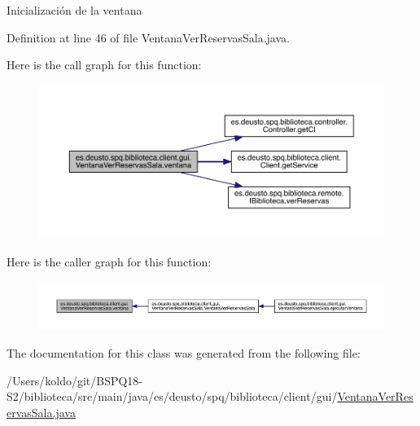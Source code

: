 Inicialización de la ventana 

Definition at line 46 of file Ventana\+Ver\+Reservas\+Sala.\+java.

Here is the call graph for this function\+:
\nopagebreak
\begin{figure}[H]
\begin{center}
\leavevmode
\includegraphics[width=350pt]{classes_1_1deusto_1_1spq_1_1biblioteca_1_1client_1_1gui_1_1_ventana_ver_reservas_sala_a0530d61d6fe002ba70b7a520c5cec330_cgraph}
\end{center}
\end{figure}
Here is the caller graph for this function\+:
\nopagebreak
\begin{figure}[H]
\begin{center}
\leavevmode
\includegraphics[width=350pt]{classes_1_1deusto_1_1spq_1_1biblioteca_1_1client_1_1gui_1_1_ventana_ver_reservas_sala_a0530d61d6fe002ba70b7a520c5cec330_icgraph}
\end{center}
\end{figure}


The documentation for this class was generated from the following file\+:\begin{DoxyCompactItemize}
\item 
/\+Users/koldo/git/\+B\+S\+P\+Q18-\/\+S2/biblioteca/src/main/java/es/deusto/spq/biblioteca/client/gui/\mbox{\hyperlink{_ventana_ver_reservas_sala_8java}{Ventana\+Ver\+Reservas\+Sala.\+java}}\end{DoxyCompactItemize}

